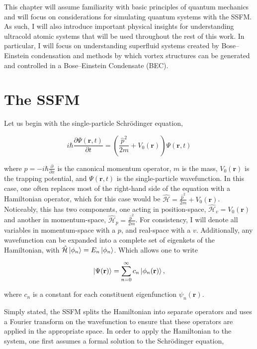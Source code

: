This chapter will assume familiarity with basic principles of quantum mechanics and will focus on considerations for simulating quantum systems with the SSFM.
As such, I will also introduce important physical insights for understanding ultracold atomic systems that will be used throughout the rest of this work.
In particular, I will focus on understanding superfluid systems created by Bose--Einstein condensation and methods by which vortex structures can be generated and controlled in a Bose--Einstein Condensate (BEC).


\section{The SSFM}
Let us begin with the single-particle Schr\"odinger equation,

\begin{equation}
i\hbar \frac{\partial \Psi(\mathbf{r}, t)}{\partial t} = \left(\frac{\hat p^2}{2m} + V_0(\mathbf{r}) \right)\Psi(\mathbf{r},t)
\label{eqn:schrody}
\end{equation}

\noindent where $\hat p = -i\hbar\frac{\partial}{\partial x}$ is the canonical momentum operator, $m$ is the mass, $V_0(\mathbf{r})$ is the trapping potential, and $\Psi(\mathbf{r},t)$ is the single-particle wavefunction.
In this case, one often replaces most of the right-hand side of the equation with a Hamiltonian operator, which for this case would be $\mathcal{\hat H} = \frac{\hat p^2}{2m} + V_0(\mathbf{r})$.
Noticeably, this has two components, one acting in position-space, $\mathcal{\hat H}_v = V_0(\mathbf{r})$ and another in momentum-space, $\mathcal{\hat H}_p = \frac{\hat p^2}{2m}$.
For consistency, I will denote all variables in momentum-space with a $p$, and real-space with a $v$.
Additionally, any wavefunction can be expanded into a complete set of eigenkets of the Hamiltonian, with $\mathcal{\hat H}\ket{\phi_n} = E_n\ket{\phi_n}$.
Which allows one to write

\begin{equation}
\ket{\Psi(\mathbf{r})} = \sum_{n=0}^\infty c_n \ket{\phi_n(\mathbf{r})},
\end{equation}

\noindent where $c_n$ is a constant for each constituent eigenfunction $\psi_n(\mathbf{r})$.

Simply stated, the SSFM splits the Hamiltonian into separate operators and uses a Fourier transform on the wavefunction to ensure that these operators are applied in the appropriate space.
In order to apply the Hamiltonian to the system, one first assumes a formal solution to the Schr\"odinger equation,

